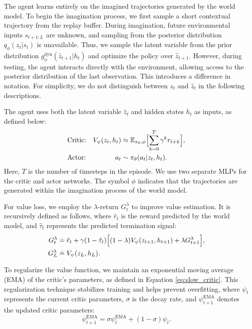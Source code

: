 The agent learns entirely on the imagined trajectories generated by the world model.
To begin the imagination process, we first sample a short contextual trajectory from the replay buffer.
During imagination, future environmental inputs $s_{t+1:L}$ are unknown, and sampling from the posterior distribution $q_\phi(z_t|s_t)$ is unavailable.
Thus, we sample the latent variable from the prior distribution $g^{\mathrm{dyn}}_\phi(\hat{z}_{t+1}|h_t)$ and optimize the policy over $\hat{z}_{t+1}$.
However, during testing, the agent interacts directly with the environment, allowing access to the posterior distribution of the last observation.
This introduces a difference in notation.
For simplicity, we do not distinguish between $z_t$ and $\hat{z}_t$ in the following descriptions.

The agent uses both the latent variable $\hat{z}_{t}$ and hidden states $h_t$ as inputs, as defined below:
\begin{equation} \label{eq:agent}
\begin{aligned}
&\text{Critic:} & V_\psi(z_{t}, h_t)&\approx \mathbb{E}_{\pi_\theta, \phi}\Bigl[\sum_{k=0}^T \gamma^k r_{t+k}\Bigr],\\
&\text{Actor:} & a_t&\sim\pi_\theta(a_t|z_{t}, h_t).\\
\end{aligned}
\end{equation}
Here, $T$ is the number of timesteps in the episode. We use two separate MLPs for the critic and actor networks.
The symbol $\phi$ indicates that the trajectories are generated within the imagination process of the world model.

For value loss, we employ the $\lambda$-return $G^\lambda_{t}$ \citep{sutton_reinforcement_2018, hafner_mastering_2023} to improve value estimation.
It is recursively defined as follows, where $\hat{r}_t$ is the reward predicted by the world model, and $\hat{\tau}_t$ represents the predicted termination signal:
\begin{subequations}
    \label{eq:lambda-return}
    \begin{align}
        G^\lambda_{t} &\doteq \hat{r}_t + \gamma (1-\hat{\tau}_t) \Bigl[(1-\lambda) V_{\psi}(z_{t+1}, h_{t+1}) + \lambda G^{\lambda}_{t+1}\Bigr], \\
        G^\lambda_{L} &\doteq V_{\psi}(z_{L}, h_{L}).
    \end{align}
\end{subequations}

To regularize the value function, we maintain an exponential moving average (EMA) of the critic's parameters, as defined in Equation \eqref{eq:slow_critic}.
This regularization technique stabilizes training and helps prevent overfitting, where $\psi_t$ represents the current critic parameters, $\sigma$ is the decay rate, and $\psi^{\mathrm{EMA}}_{t+1}$ denotes the updated critic parameters:
\begin{equation} \label{eq:slow_critic}
\psi^{\mathrm{EMA}}_{t+1} = \sigma \psi^{\mathrm{EMA}}_t + (1-\sigma) \psi_{t}.
\end{equation}


